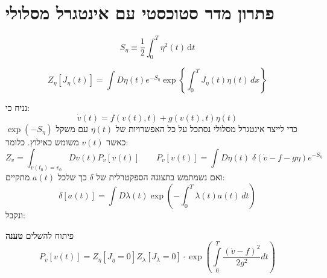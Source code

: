 \documentclass{tstextbook}
\begin{document}
\section{פתרון מדר סטוכסטי עם אינטגרל מסלולי}

\begin{definition}
$$S_{\eta}\equiv \frac{1}{2}\int_{0}^{T} \eta^{2}(t) \, \mathrm{d}t $$

\end{definition}
\begin{corollary}
$$Z_{\eta}\left[ J_{\eta }(t) \right]=\int D\eta(t)e^{ -S_{\eta} }\exp \left\{  \int_{0}^{T} J_{\eta}(t)\eta(t) \, dx   \right\}  $$

\end{corollary}
נניח כי:
$${\dot{v}}\left(t\right)=f\left(v\left(t\right),t\right)+g\left(v\left(t\right),t\right)\eta\left(t\right)$$
כדי לייצר אינטגרל מסלולי נסתכל על כל האפשרויות של \(\eta(t)\) עם משקל \(\exp\left( -S_{\eta} \right)\) כאשר \(v(t)\) משומש כאילוץ. כלומר:
$$Z_{v}=\int _{v(t_{0})=v_{0}}Dv(t)P_{v}[v(t)]  \qquad P_{v}[v(t)]=\int D\eta(t)\; \delta\left( \dot{v}-f-g\eta \right)e^{ -S_{\eta} } $$
ואם נשמתמש בתצוגה הספקטרלית של \(\delta\) כך שלכל \(a(t)\) מתקיים:
$$\delta[a(t)]=\int D\lambda(t)\exp\left( -\int_{0}^{T} \lambda(t)a(t) \, dt  \right)$$
ונקבל:

פיתוח להשלים
\textbf{טענה}$$P_{v}\left[v\left(t\right)\right]=Z_{\eta}\left[J_{\eta}=0\right]Z_{\lambda}\left[J_{\lambda}=0\right]\cdot\exp\left(\int\limits_{0}^{T}\frac{\left({\dot{v}}-f\right)^{2}}{2g^{2}}d t\right)$$
\end{document}
